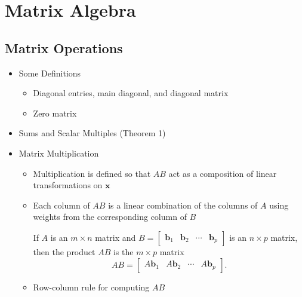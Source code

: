 \documentclass[10pt]{book}
\newenvironment{boxdef}{\begin{mdframed}[backgroundcolor=gray!30,linewidth=0pt,nobreak=true]}{\end{mdframed}}
\newcommand{\vect}[1]{\ensuremath{\boldsymbol{\mathbf{#1}}}}
\begin{document}
\newpage



\chapter{Matrix Algebra}
\section{Matrix Operations}
\begin{itemize}
	\item Some Definitions
		\begin{itemize}
			\item Diagonal entries, main diagonal, and diagonal matrix
			\item Zero matrix
		\end{itemize}
	\item Sums and Scalar Multiples (Theorem 1)
	\item Matrix Multiplication
		\begin{itemize}
			\item Multiplication is defined so that $AB$ act as a composition of linear transformations on $\vect{x}$
			\item Each column of $AB$ is a linear combination of the columns of $A$ using weights from the corresponding column of $B$
			\begin{boxdef}
				If $A$ is an $m\times n$ matrix and $B=\begin{bmatrix}\vect{b}_1&\vect{b}_2&\cdots&\vect{b}_p\end{bmatrix}$ is an $n\times p$ matrix, then the product $AB$ is the $m\times p$ matrix
				$$ AB = \begin{bmatrix}A\vect{b}_1&A\vect{b}_2&\cdots&A\vect{b}_p\end{bmatrix}. $$
			\end{boxdef}
			\item Row-column rule for computing $AB$

\end{itemize}
\end{itemize}
\end{document}
